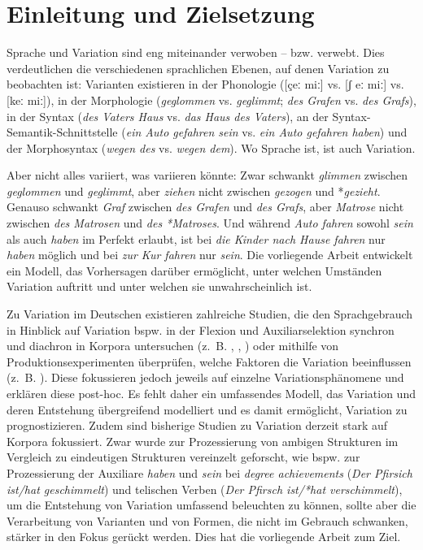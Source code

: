 \chapter{Einleitung und Zielsetzung}

Sprache und Variation sind eng miteinander verwoben -- bzw. verwebt. Dies verdeutlichen die verschiedenen sprachlichen Ebenen, auf denen Variation zu beobachten ist: Varianten existieren in der Phonologie ([\c{c}eː miː] vs. [ʃ eː miː] vs. [keː miː]), in der Morphologie (\textit{geglommen} vs. \textit{geglimmt}; \textit{des Grafen} vs. \textit{des Grafs}), in der Syntax (\textit{des Vaters Haus} vs. \textit{das Haus des Vaters}), an der Syntax-Semantik-Schnittstelle (\textit{ein Auto gefahren sein} vs. \textit{ein Auto gefahren haben}) und der Morphosyntax (\textit{wegen des} vs. \textit{wegen dem}). Wo Sprache ist, ist auch Variation.

Aber nicht alles variiert, was variieren könnte: Zwar schwankt \textit{glimmen} zwischen \textit{geglommen} und \textit{geglimmt}, aber \textit{ziehen} nicht zwischen \textit{gezogen} und *\textit{gezieht}. Genauso schwankt \textit{Graf} zwischen \textit{des Grafen} und \textit{des Grafs}, aber \textit{Matrose} nicht zwischen \textit{des Matrosen} und \textit{des *Matroses}. Und während \textit{Auto fahren} sowohl  \textit{sein} als auch \textit{haben} im Perfekt erlaubt, ist bei \textit{die Kinder nach Hause fahren} nur \textit{haben} möglich und bei \textit{zur Kur fahren} nur \textit{sein}.
Die vorliegende Arbeit entwickelt ein Modell, das Vorhersagen darüber ermöglicht, unter welchen Umständen Variation auftritt und unter welchen sie unwahrscheinlich ist. 

Zu Variation im Deutschen existieren zahlreiche Studien, die den Sprachgebrauch in Hinblick auf Variation bspw. in der Flexion und Auxiliarselektion synchron und diachron in Korpora untersuchen (z.~B. \cite{Nowak.2015}, \cite{Gillmann.2016}, \cite{Schafer.2019}) oder mithilfe von Produktionsexperimenten überprüfen, welche Faktoren die Variation beeinflussen (z.~B. \cite{Kopcke.2000b, Kopcke.2005}). Diese fokussieren jedoch jeweils auf einzelne Variationsphänomene und erklären diese post-hoc. Es fehlt daher ein umfassendes Modell, das Variation und deren Entstehung übergreifend modelliert und es damit ermöglicht, Variation zu prognostizieren. Zudem sind bisherige Studien zu Variation derzeit stark auf Korpora fokussiert. Zwar wurde zur Prozessierung von ambigen Strukturen im Vergleich zu eindeutigen Strukturen vereinzelt geforscht, wie bspw. \textcite{Roehm.2013} zur Prozessierung der Auxiliare \textit{haben} und \textit{sein} bei \textit{degree achievements} (\textit{Der Pfirsich ist/hat geschimmelt}) und telischen Verben (\textit{Der Pfirsch ist/*hat verschimmelt}), um die Entstehung von Variation umfassend beleuchten zu können, sollte aber die Verarbeitung von Varianten und von Formen, die nicht im Gebrauch schwanken, stärker in den Fokus gerückt werden. Dies hat die vorliegende Arbeit zum Ziel.

